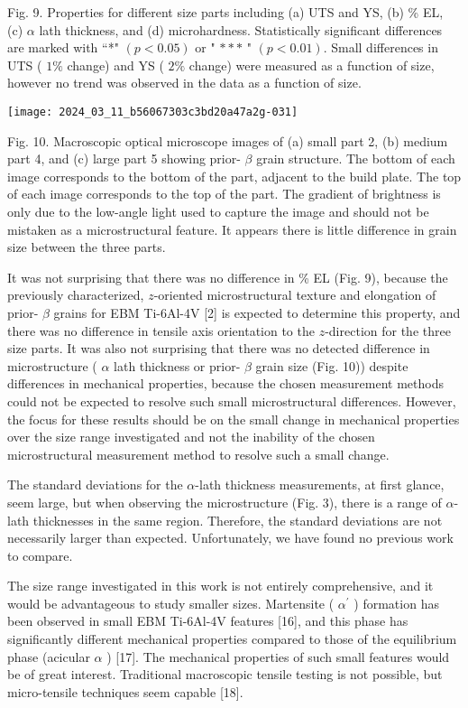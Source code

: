 \documentclass[10pt]{article}
\begin{document}
Fig. 9. Properties for different size parts including (a) UTS and YS, (b) \% EL, (c) $\alpha$ lath thickness, and (d) microhardness. Statistically significant differences are marked with “*" $(p<0.05)$ or " $* * *$ " $(p<0.01)$. Small differences in UTS ( $1 \%$ change) and YS ( $2 \%$ change) were measured as a function of size, however no trend was observed in the data as a function of size.

\begin{center}
\texttt{[image: 2024\_03\_11\_b56067303c3bd20a47a2g-031]}
\end{center}

Fig. 10. Macroscopic optical microscope images of (a) small part 2, (b) medium part 4, and (c) large part 5 showing prior- $\beta$ grain structure. The bottom of each image corresponds to the bottom of the part, adjacent to the build plate. The top of each image corresponds to the top of the part. The gradient of brightness is only due to the low-angle light used to capture the image and should not be mistaken as a microstructural feature. It appears there is little difference in grain size between the three parts.

It was not surprising that there was no difference in \% EL (Fig. 9), because the previously characterized, $z$-oriented microstructural texture and elongation of prior- $\beta$ grains for EBM Ti-6Al-4V [2] is expected to determine this property, and there was no difference in tensile axis orientation to the $z$-direction for the three size parts. It was also not surprising that there was no detected difference in microstructure ( $\alpha$ lath thickness or prior- $\beta$ grain size (Fig. 10)) despite differences in mechanical properties, because the chosen measurement methods could not be expected to resolve such small microstructural differences. However, the focus for these results should be on the small change in mechanical properties over the size range investigated and not the inability of the chosen microstructural measurement method to resolve such a small change.

The standard deviations for the $\alpha$-lath thickness measurements, at first glance, seem large, but when observing the microstructure (Fig. 3), there is a range of $\alpha$-lath thicknesses in the same region. Therefore, the standard deviations are not necessarily larger than expected. Unfortunately, we have found no previous work to compare.

The size range investigated in this work is not entirely comprehensive, and it would be advantageous to study smaller sizes. Martensite ( $\alpha^{\prime}$ ) formation has been observed in small EBM Ti-6Al-4V features [16], and this phase has significantly different mechanical properties compared to those of the equilibrium phase (acicular $\alpha$ ) [17]. The mechanical properties of such small features would be of great interest. Traditional macroscopic tensile testing is not possible, but micro-tensile techniques seem capable [18].
\end{document}
